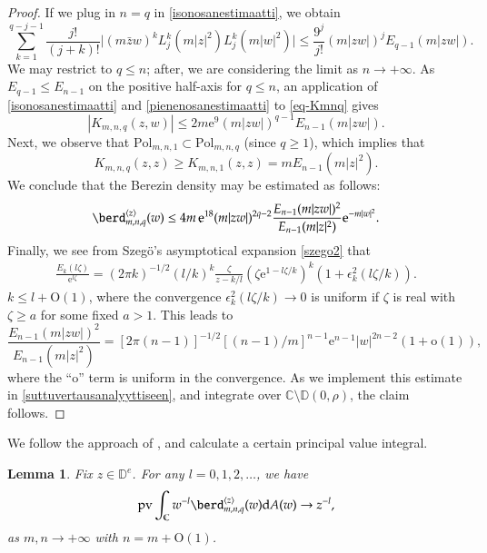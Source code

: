 \documentclass{birkart}
\newtheorem{lem}[thm]{Lemma}
\theoremstyle{definition}
\theoremstyle{remark}
\numberwithin{equation}{section}
\numberwithin{figure}{section}
\newcommand{\e}{\mathrm e}
\newcommand{\1}{{\mathbf 1}}
\newcommand{\Rpar}{q}
\newcommand{\C}{{\mathbb C}}
\newcommand{\D}{{\mathbb D}}
\newcommand{\ordo}{\mathrm{o}}
\newcommand{\Ordo}{\mathrm{O}}
\newcommand{\diff}{{\mathrm d}}
\newcommand{\pv}{\operatorname{\mathrm{pv}}}
\begin{document}
\begin{proof}
If we plug in $n=\Rpar$ in \eqref{isonosanestimaatti}, we obtain  
\begin{equation} 
\label{pienenosanestimaatti}
\sum_{k=1}^{\Rpar-j-1} \frac{j!}{(j+k)!} 
\big|(m\bar{z}w)^k L^{k}_{j}(m|z|^2)L^{k}_{j}(m|w|^2)\big|  
\leq \frac{9^j}{j!}(m|zw|)^j E_{\Rpar-1}(m|zw|).
\end{equation} 
We may restrict to $\Rpar\le n$; after, we are considering the limit as 
$n\to+\infty$.
As $E_{q-1}\le E_{n-1}$ on the positive half-axis for $q\le n$, 
an application of \eqref{isonosanestimaatti} and \eqref{pienenosanestimaatti}
to \eqref{eq-Kmnq} gives
\begin{equation}
\label{isonosanestimaatti4}
|K_{m,n,\Rpar}(z,w)| 
\leq 2m\e^9(m|zw|)^{\Rpar-1}E_{n-1}(m|zw|).
\end{equation}
Next, we observe that $\mathrm{Pol}_{m,n,1}\subset \mathrm{Pol}_{m,n,\Rpar}$
(since $q\ge1$), which implies that 
\[
K_{m,n,\Rpar}(z,z) \geq K_{m,n,1}(z,z)=mE_{n-1}(m|z|^2).
\]
We conclude that the Berezin density may be estimated as follows:
\begin{align} 
\label{suttuvertausanalyyttiseen}
\berd^{\langle z\rangle}_{m,n,\Rpar}(w) \leq  
4m\,\e^{18}(m|zw|)^{2\Rpar-2}\frac{E_{n-1}(m|zw|)^2}{E_{n-1}(m|z|^2)}
\e^{-m|w|^2}.
\end{align}
Finally, we see from Szeg\"o's asymptotical expansion \eqref{szego2} that
\begin{align} 
\label{szego4}
\frac{E_k(l\zeta)}{\e^{l\zeta}}= (2 \pi k)^{-1/2}(l/k)^{k}
\frac{\zeta}{z-k/l}(\zeta\e^{1-l\zeta/k})^k(1+\epsilon^{2}_k(l\zeta/k)).
\end{align}
$k\le l+\Ordo(1)$, where the convergence 
$\epsilon^{2}_k(l\zeta/k)\to0$ is uniform if $\zeta$ is real with 
$\zeta\ge a$ for some fixed $a>1$. This leads to
\[
\frac{E_{n-1}(m|zw|)^2}{E_{n-1}(m|z|^2)}=[2\pi(n-1)]^{-1/2}[(n-1)/m]^{n-1}
\e^{n-1}|w|^{2n-2}(1+\ordo(1)),
\]
where the ``$\ordo$'' term is uniform in the convergence. As we implement this 
estimate in \eqref{suttuvertausanalyyttiseen}, and integrate over $\C\setminus
\D(0,\rho)$, the claim follows. 
\end{proof}
\medskip

We follow the approach of \cite{ahm1}, and calculate a certain principal value
integral.
 
\begin{lem}
Fix $z\in\D^e$. For any $l=0,1,2,\ldots$, we have 
\[ 
\pv 
\int_{\mathbb{C}}w^{-l} \berd^{\langle z\rangle}_{m,n,\Rpar}(w)\diff A(w)
\to z^{-l}, 
\]
as $m,n\to+\infty$ with $n=m+\Ordo(1)$.  
\end{lem}
\end{document}
